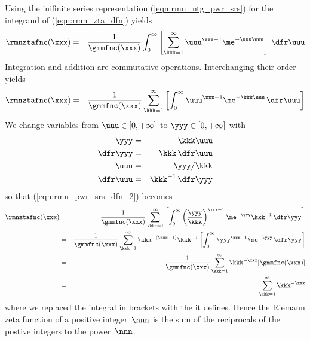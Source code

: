 \documentclass[12pt]{article}
\begin{document}
Using the inifinite series representation (\ref{eqn:rmn_ntg_pwr_srs}) for
the integrand of (\ref{eqn:rmn_zta_dfn}) yields
\begin{eqnarray}
\rmnztafnc(\xxx) & = & \frac{1}{\gmmfnc(\xxx)}
\int_{0}^{\infty} \left[ \sum_{\kkk=1}^{\infty} \uuu^{\xxx-1}
  \me^{-\kkk\uuu} \right] \,\dfr\uuu \nonumber
\label{eqn:rmn_pwr_srs_dfn_1}
\end{eqnarray}
Integration and addition are commutative operations.
Interchanging their order yields
\begin{eqnarray}
\rmnztafnc(\xxx) & = & \frac{1}{\gmmfnc(\xxx)}
\sum_{\kkk=1}^{\infty} 
\left[ \int_{0}^{\infty} \uuu^{\xxx-1} \me^{-\kkk\uuu}  \,\dfr\uuu \right]
\label{eqn:rmn_pwr_srs_dfn_2}
\end{eqnarray}
We change variables from 
$\uuu \in [0,+\infty]$ to $\yyy \in [0,+\infty]$ with
\begin{eqnarray}
\yyy & = & \kkk\uuu \nonumber \\
\dfr\yyy & = & \kkk \,\dfr\uuu \nonumber \\
\uuu & = & \yyy/\kkk \nonumber \\
\dfr\uuu & = & \kkk^{-1} \,\dfr\yyy
\label{eqn:rmn_cov}
\end{eqnarray}
so that (\ref{eqn:rmn_pwr_srs_dfn_2}) becomes
\begin{eqnarray}
\rmnztafnc(\xxx) & = & \frac{1}{\gmmfnc(\xxx)}
\sum_{\kkk=1}^{\infty} 
\left[ \int_{0}^{\infty} \left( \frac{\yyy}{\kkk} \right)^{\xxx-1} 
\me^{-\yyy} \kkk^{-1} \,\dfr\yyy \right] \nonumber \\
& = & \frac{1}{\gmmfnc(\xxx)}
\sum_{\kkk=1}^{\infty} \kkk^{-(\xxx-1)} \kkk^{-1}
\left[ \int_{0}^{\infty} \yyy^{\xxx-1} \me^{-\yyy} \,\dfr\yyy \right] \nonumber \\
& = & \frac{1}{\gmmfnc(\xxx)}
\sum_{\kkk=1}^{\infty} \kkk^{-\xxx} [ \gmmfnc(\xxx) ] \nonumber \\
& = & \sum_{\kkk=1}^{\infty} \kkk^{-\xxx}
\label{eqn:rmn_pwr_srs_dfn_3}
\end{eqnarray}
where we replaced the integral in brackets with the 
 it defines.
Hence the Riemann zeta function of a positive integer~$\nnn$ is the
sum of the reciprocals of the postive integers to the power~$\nnn$.
\end{document}
